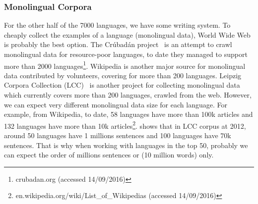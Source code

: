 \documentclass[12pt,twoside,final,hidelinks]{ltthesis}
\theoremstyle{definition}
\begin{document}
\subsubsection{Monolingual Corpora} 
For the other half of the 7000 languages, we have some writing system. To cheaply collect the examples of a language (monolingual data), World Wide Web is probably the best option. 
The Cr\'ubad\'an project~\cite{Scannell07thecrubadan} is an attempt to crawl
 monolingual data for resource-poor languages, to date they managed to support more than 2000 languages\footnote{crubadan.org (accessed 14/09/2016)}. Wikipedia is
  another major source for monolingual data contributed by volunteers, covering for more than 200 languages. Leipzig Corpora Collection (LCC)~\cite{GOLDHAHN12.327.L12-1154} is another project for
   collecting monolingual data which currently covers more than 200 languages, crawled from the web. 
However, we can expect very different monolingual data size for each language. For example, from Wikipedia, to date, 58 languages have more than 100k articles and 132 languages have more than 10k articles\footnote{en.wikipedia.org/wiki/List_of_Wikipedias (accessed 14/09/2016)}.
 shows that in LCC corpus at 2012, around 50 languages have 1 millions sentences and 100 languages have 70k sentences. That is why when working with languages in the top 50, probably we can expect the order of millions sentences or (10 million words) only. 



\end{document}
